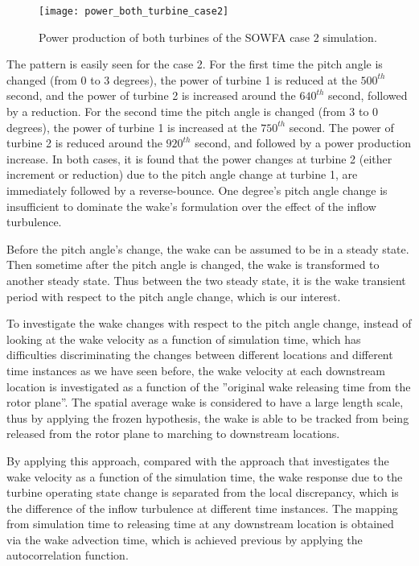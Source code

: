 \documentclass{umthesis}
\begin{document}
\begin{figure}
  \centering
  \texttt{[image: power\_both\_turbine\_case2]}
  \caption{Power production of both turbines of the SOWFA case 2 simulation.}\label{fig:power_both_turbine_case2}
\end{figure}

The pattern is easily seen for the case 2. For the first time the pitch angle is changed (from 0 to 3 degrees), the power of turbine 1 is reduced at the $500^{th}$ second, and the power of turbine 2 is increased around the $640^{th}$ second, followed by a reduction. For the second time the pitch angle is changed (from 3 to 0 degrees), the power of turbine 1 is increased at the $750^{th}$ second. The power of turbine 2 is reduced around the $920^{th}$ second, and followed by a power production increase. In both cases, it is found that the power changes at turbine 2 (either increment or reduction) due to the pitch angle change at turbine 1, are immediately followed by a reverse-bounce. One degree's pitch angle change is insufficient to dominate the wake's formulation over the effect of the inflow turbulence.

Before the pitch angle's change, the wake can be assumed to be in a steady state. Then sometime after the pitch angle is changed, the wake is transformed to another steady state. Thus between the two steady state, it is the wake transient period with respect to the pitch angle change, which is our interest.

To investigate the wake changes with respect to the pitch angle change, instead of looking at the wake velocity as a function of simulation time, which has difficulties discriminating the changes between different locations and different time instances as we have seen before, the wake velocity at each downstream location is investigated as a function of the ”original wake releasing time from the rotor plane”. The spatial average wake is considered to have a large length scale, thus by applying the frozen hypothesis, the wake is able to be tracked from being released from the rotor plane to marching to downstream locations.

By applying this approach, compared with the approach that investigates the wake velocity as a function of the simulation time, the wake response due to the turbine operating state change is separated from the local discrepancy, which is the difference of the inflow turbulence at different time instances. The mapping from simulation time to releasing time at any downstream location is obtained via the wake advection time, which is achieved previous by applying the autocorrelation function.
\end{document}
